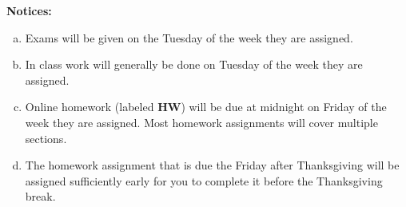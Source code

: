 \documentclass[12pt]{article}
\newcounter{ex}\setcounter{ex}{0}
\newenvironment{alphalist}{
  \begin{enumerate}[(a)]
    \addtolength{\itemsep}{-0.5\itemsep}}
  {\end{enumerate}}
\begin{document}
\vspace{0.1in}
\noindent \textbf{Notices:}


\begin{alphalist}
   \item Exams will be given on the Tuesday of the week they are assigned.
   
   \item In class work  will generally be 
    done on Tuesday of the week they are assigned.

    \item Online homework (labeled \textbf{HW}) will be due at midnight on
          Friday of the week they are assigned. Most homework assignments will
          cover multiple sections. 

    \item The homework assignment that is due the Friday after Thanksgiving
          will be assigned sufficiently early for you to complete it before
          the Thanksgiving break.
\end{alphalist}

\vspace{0.1in}
\end{document}
